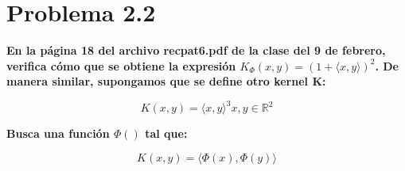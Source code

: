 \section*{Problema 2.2}

\textbf{En la página 18 del archivo recpat6.pdf de la clase del 9 de febrero, verifica cómo que se obtiene la expresión $K_\Phi (x, y) = (1 + \langle x, y \rangle)^2$. De manera similar, supongamos que se define otro kernel K:}

\begin{equation*}
    K(x,y) = \langle x,y \rangle^3 x,y \in \mathbb{R}^2
\end{equation*}

\textbf{Busca una función $\Phi()$ tal que:}

\begin{equation*}
    K(x,y) = \langle \Phi(x), \Phi(y) \rangle
\end{equation*}